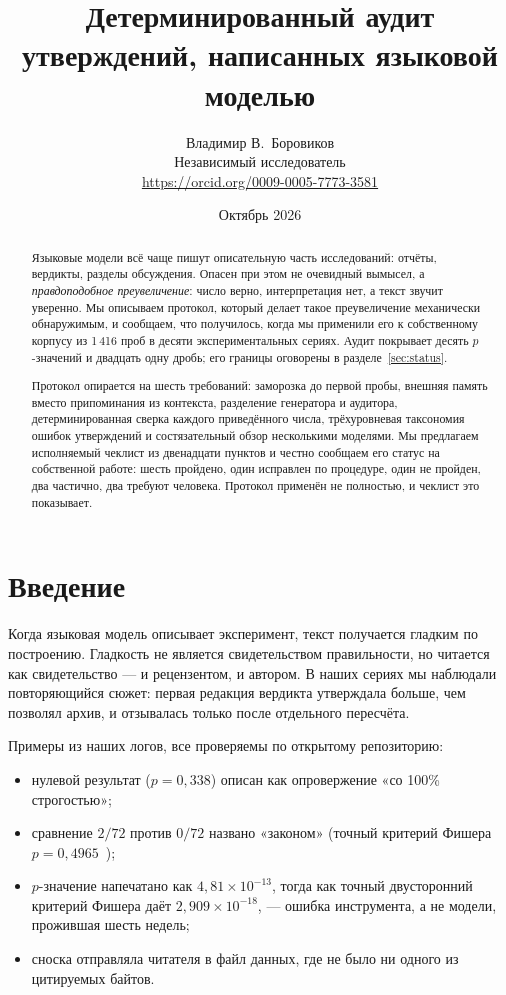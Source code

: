 \documentclass[11pt]{article}
\title{Детерминированный аудит утверждений, написанных языковой моделью}
\author{Владимир В.~Боровиков\\
\small Независимый исследователь\\
\small \url{https://orcid.org/0009-0005-7773-3581}}
\date{Октябрь 2026}
\begin{document}
\maketitle

\begin{abstract}
Языковые модели всё чаще пишут описательную часть исследований: отчёты,
вердикты, разделы обсуждения. Опасен при этом не очевидный вымысел, а
\emph{правдоподобное преувеличение}: число верно, интерпретация нет, а текст
звучит уверенно. Мы описываем протокол, который делает такое преувеличение
механически обнаружимым, и сообщаем, что получилось, когда мы применили его к
собственному корпусу из 1\,416 проб в десяти экспериментальных сериях. Аудит
покрывает десять $p$-значений и двадцать одну дробь; его границы оговорены в
разделе~\ref{sec:status}.

Протокол опирается на шесть требований: заморозка до первой пробы, внешняя
память вместо припоминания из контекста, разделение генератора и аудитора,
детерминированная сверка каждого приведённого числа, трёхуровневая таксономия
ошибок утверждений и состязательный обзор несколькими моделями. Мы предлагаем
исполняемый чеклист из двенадцати пунктов и честно сообщаем его статус на
собственной работе: шесть пройдено, один исправлен по процедуре, один не
пройден, два частично, два требуют человека. Протокол применён не полностью,
и чеклист это показывает.
\end{abstract}

\section{Введение}

Когда языковая модель описывает эксперимент, текст получается гладким по
построению. Гладкость не является свидетельством правильности, но читается как
свидетельство — и рецензентом, и автором. В наших сериях мы наблюдали
повторяющийся сюжет: первая редакция вердикта утверждала больше, чем позволял
архив, и отзывалась только после отдельного пересчёта.

Примеры из наших логов, все проверяемы по открытому репозиторию:

\begin{itemize}
  \item нулевой результат ($p = 0{,}338$) описан как опровержение «со 100\%
        строгостью»;
  \item сравнение $2/72$ против $0/72$ названо «законом» (точный критерий
        Фишера $p = 0{,}4965$~\cite{fisher1935});
  \item $p$-значение напечатано как $4{,}81\times10^{-13}$, тогда как точный
        двусторонний критерий Фишера даёт $2{,}909\times10^{-18}$, — ошибка
        инструмента, а не модели, прожившая шесть недель;
  \item сноска отправляла читателя в файл данных, где не было ни одного из
        цитируемых байтов.
\end{itemize}
\end{document}
